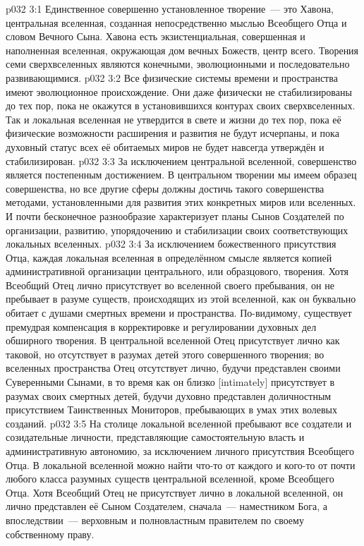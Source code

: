 \vs p032 3:1 Единственное совершенно установленное творение~--- это Хавона, центральная вселенная, созданная непосредственно мыслью Всеобщего Отца и словом Вечного Сына. Хавона есть экзистенциальная, совершенная и наполненная вселенная, окружающая дом вечных Божеств, центр всего. Творения семи сверхвселенных являются конечными, эволюционными и последовательно развивающимися.
\vs p032 3:2 Все физические системы времени и пространства имеют эволюционное происхождение. Они даже физически не стабилизированы до тех пор, пока не окажутся в установившихся контурах своих сверхвселенных. Так и локальная вселенная не утвердится в свете и жизни до тех пор, пока её физические возможности расширения и развития не будут исчерпаны, и пока духовный статус всех её обитаемых миров не будет навсегда утверждён и стабилизирован.
\vs p032 3:3 За исключением центральной вселенной, совершенство является постепенным достижением. В центральном творении мы имеем образец совершенства, но все другие сферы должны достичь такого совершенства методами, установленными для развития этих конкретных миров или вселенных. И почти бесконечное разнообразие характеризует планы Сынов Создателей по организации, развитию, упорядочению и стабилизации своих соответствующих локальных вселенных.
\vs p032 3:4 \pc За исключением божественного присутствия Отца, каждая локальная вселенная в определённом смысле является копией административной организации центрального, или образцового, творения. Хотя Всеобщий Отец лично присутствует во вселенной своего пребывания, он не пребывает в разуме существ, происходящих из этой вселенной, как он буквально обитает с душами смертных времени и пространства. По\hyp{}видимому, существует премудрая компенсация в корректировке и регулировании духовных дел обширного творения. В центральной вселенной Отец присутствует лично как таковой, но отсутствует в разумах детей этого совершенного творения; во вселенных пространства Отец отсутствует лично, будучи представлен своими Суверенными Сынами, в то время как он близко [intimately] присутствует в разумах своих смертных детей, будучи духовно представлен доличностным присутствием Таинственных Мониторов, пребывающих в умах этих волевых созданий.
\vs p032 3:5 На столице локальной вселенной пребывают все создатели и созидательные личности, представляющие самостоятельную власть и административную автономию, за исключением личного присутствия Всеобщего Отца. В локальной вселенной можно найти что-то от каждого и кого-то от почти любого класса разумных существ центральной вселенной, кроме Всеобщего Отца. Хотя Всеобщий Отец не присутствует лично в локальной вселенной, он лично представлен её Сыном Создателем, сначала~--- наместником Бога, а впоследствии~--- верховным и полновластным правителем по своему собственному праву.
